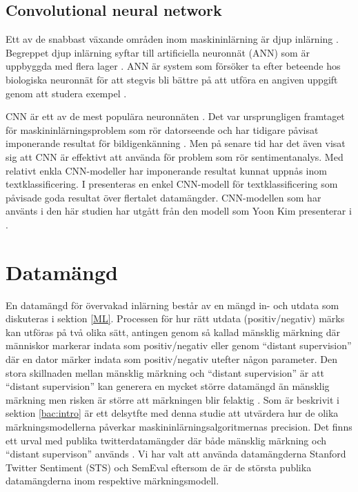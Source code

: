 \documentclass{kaumasters} %
\begin{document}
\subsection{Convolutional neural network}\label{bak:cnn}
Ett av de snabbast växande områden inom maskininlärning är djup inlärning \cite{TSAsurvey}. Begreppet djup inlärning syftar till artificiella neuronnät (ANN) som är uppbyggda med flera lager  \cite{cnn:001}. ANN är system som försöker ta efter beteende hos biologiska neuronnät för att stegvis bli bättre på att utföra en angiven uppgift genom att studera exempel \cite{wiki:015}. 

CNN är ett av de mest populära neuronnäten  \cite{cnn:001}. Det var ursprungligen framtaget för maskininlärningsproblem som rör datorseende och har tidigare påvisat imponerande resultat för bildigenkänning \cite{cnn:003, cnn:006}. Men på senare tid har det även visat sig att CNN är effektivt att använda för problem som rör sentimentanalys. Med relativt enkla CNN-modeller har imponerande resultat kunnat uppnås inom textklassificering.  I \cite{cnn:003} presenteras en enkel CNN-modell för textklassificering som påvisade goda resultat över flertalet datamängder. CNN-modellen som har använts i den här studien har utgått från den modell som Yoon Kim presenterar i \cite{cnn:003}.

\section{Datamängd} \label{DS}
En datamängd för övervakad inlärning består av en mängd in- och utdata som diskuteras i sektion \ref{ML}. Processen för hur rätt utdata (positiv/negativ) märks kan utföras på två olika sätt, antingen genom så kallad mänsklig märkning där människor markerar indata som positiv/negativ eller genom “distant supervision” där en dator märker indata som positiv/negativ utefter någon parameter. Den stora skillnaden mellan mänsklig märkning och “distant supervision” är att “distant supervision” kan generera en mycket större datamängd än mänsklig märkning men risken är större att märkningen blir felaktig \cite{TSAsurvey}. 
Som är beskrivit i sektion \ref{bac:intro} är ett delsytfte med denna studie att utvärdera hur de olika märkningsmodellerna påverkar maskininlärningsalgoritmernas precision. Det finns ett urval med publika twitterdatamängder där både mänsklig märkning och “distant supervison” används \cite{TSAsurvey}. Vi har valt att använda datamängderna Stanford Twitter Sentiment (STS) \cite{sts:001} och SemEval \cite{SemEval:001} eftersom de är de största publika datamängderna inom respektive märkningsmodell.
\end{document}
